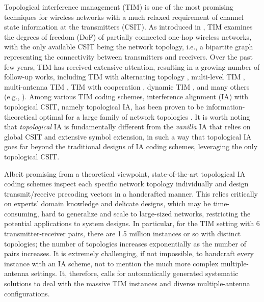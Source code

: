 \documentclass[a4paper,journal]{IEEEtran}
\begin{document}
Topological interference management (TIM) is one of the most promising techniques for wireless networks with a much relaxed requirement of channel state information at the transmitters (CSIT). As introduced in \cite{jafar2013topological}, TIM examines the degrees of freedom (DoF) of partially connected one-hop wireless networks, with the only available CSIT being the network topology, i.e., a bipartite graph representing the connectivity between transmitters and receivers. Over the past few years, TIM has received extensive attention, resulting in a growing number of follow-up works, including TIM with alternating topology \cite{sun2013alternating,gherekhloo2013alternating2}, multi-level TIM \cite{geng2021multilevel}, multi-antenna TIM \cite{sun2014topologicalMIMO}, TIM with cooperation \cite{yi2015topological,yi2018topological}, dynamic TIM \cite{yi2019opportunistic,liang2022topological}, and many others (e.g., \cite{maleki2013optimality,yi2018tdma,doumiati2019framework,davoodi2018network,yang2017topological,aquilina2016degrees,shi2016low,gao2014topological,naderializadeh2014interference,mutangana2020topological}). 
Among various TIM coding schemes, interference alignment (IA) with topological CSIT, namely topological IA, 
has been proven to be information-theoretical optimal for a large family of network topologies \cite{jafar2013topological}.
It is worth noting that \textit{topological} IA is fundamentally different from the \textit{vanilla} IA \cite{8186780} that relies on global CSIT and extensive symbol extension, in such a way that topological IA goes far beyond the traditional designs of IA coding schemes, leveraging the only topological CSIT.

Albeit promising from a theoretical viewpoint, state-of-the-art topological IA coding schemes inspect each specific network topology individually and design transmit/receive precoding vectors in a handcrafted manner. This relies critically on experts' domain knowledge and delicate designs, which may be time-consuming, hard to generalize and scale to large-sized networks, restricting the potential applications to system designs. 
In particular, for the TIM setting with 6 transmitter-receiver pairs, there are 1.5 million instances or so with distinct topologies; the number of topologies increases exponentially as the number of pairs increases. It is extremely challenging, if not impossible, to handcraft every instance with an IA scheme, not to mention the much more complex multiple-antenna settings. It, therefore, calls for automatically generated systematic solutions to deal with the massive TIM instances and diverse multiple-antenna configurations.
\end{document}
